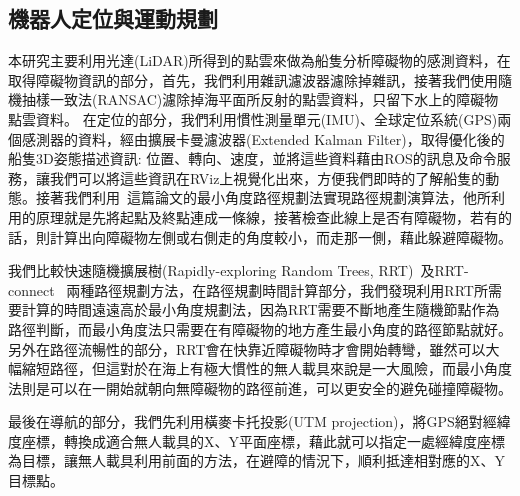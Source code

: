 \subsection{機器人定位與運動規劃}

本研究主要利用光達(LiDAR)所得到的點雲來做為船隻分析障礙物的感測資料，在取得障礙物資訊的部分，首先，我們利用雜訊濾波器濾除掉雜訊，接著我們使用隨機抽樣一致法(RANSAC)濾除掉海平面所反射的點雲資料，只留下水上的障礙物點雲資料。
在定位的部分，我們利用慣性測量單元(IMU)、全球定位系統(GPS)兩個感測器的資料，經由擴展卡曼濾波器(Extended Kalman Filter)，取得優化後的船隻3D姿態描述資訊: 位置、轉向、速度，並將這些資料藉由ROS的訊息及命令服務，讓我們可以將這些資訊在RViz上視覺化出來，方便我們即時的了解船隻的動態。接著我們利用~\cite{Zhuang2005real}這篇論文的最小角度路徑規劃法實現路徑規劃演算法，他所利用的原理就是先將起點及終點連成一條線，接著檢查此線上是否有障礙物，若有的話，則計算出向障礙物左側或右側走的角度較小，而走那一側，藉此躲避障礙物。

我們比較快速隨機擴展樹(Rapidly-exploring Random Trees, RRT)~\cite{ABry2011RRT}及RRT-connect~\cite{JJKuffner2000RRTConnect} 兩種路徑規劃方法，在路徑規劃時間計算部分，我們發現利用RRT所需要計算的時間遠遠高於最小角度規劃法，因為RRT需要不斷地產生隨機節點作為路徑判斷，而最小角度法只需要在有障礙物的地方產生最小角度的路徑節點就好。另外在路徑流暢性的部分，RRT會在快靠近障礙物時才會開始轉彎，雖然可以大幅縮短路徑，但這對於在海上有極大慣性的無人載具來說是一大風險，而最小角度法則是可以在一開始就朝向無障礙物的路徑前進，可以更安全的避免碰撞障礙物。

最後在導航的部分，我們先利用橫麥卡托投影(UTM projection)，將GPS絕對經緯度座標，轉換成適合無人載具的X、Y平面座標，藉此就可以指定一處經緯度座標為目標，讓無人載具利用前面的方法，在避障的情況下，順利抵達相對應的X、Y目標點。